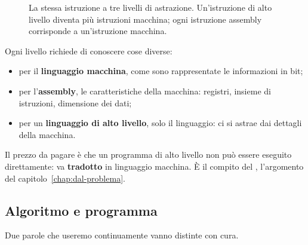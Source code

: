 \begin{figure}[H]
  \caption{La stessa istruzione a tre livelli di astrazione. Un'istruzione
           di alto livello diventa più istruzioni macchina; ogni istruzione
           assembly corrisponde a un'istruzione macchina.}
  \label{fig:livelli}
\end{figure}

Ogni livello richiede di conoscere cose diverse:

\begin{itemize}
  \item per il \textbf{linguaggio macchina}, come sono rappresentate le
        informazioni in bit;
  \item per l'\textbf{assembly}, le caratteristiche della macchina:
        registri, insieme di istruzioni, dimensione dei dati;
  \item per un \textbf{linguaggio di alto livello}, solo il linguaggio: ci
        si astrae dai dettagli della macchina.
\end{itemize}

Il prezzo da pagare è che un programma di alto livello non può essere
eseguito direttamente: va \textbf{tradotto} in linguaggio macchina. È il
compito del , l'argomento del
capitolo~\ref{chap:dal-problema}.

\subsection{Algoritmo e programma}

Due parole che useremo continuamente vanno distinte con cura.



